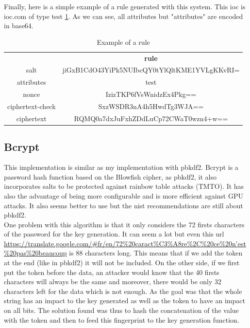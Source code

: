 \documentclass{eplmastersthesis}
\begin{document}
Finally, here is a simple example of a rule generated with this system. This \gls{ioc} is ioc.com of type test \ref{Example-rule-pbkdf2}. As we can see, all attributes but "attributes" are encoded in base64.
\begin{table}[]
\centering
\caption{Example of a rule}
\label{Example-rule-pbkdf2}
\begin{tabular}{cc}
{\textbf{}}  & {\textbf{rule}}                          \\
salt             & jiGxB1CdO43YiPk5NUIbcQY0tYlQltKME1YVLgKKvRI= \\
attributes       & test                                         \\
nonce            & IzizTKP6fVsWnidzEx4Pkg==                     \\
ciphertext-check & SxzWSDR3nA4h5HwdTg3WJA==                     \\
ciphertext       & RQMQ0a7dxJuFxhZDdLuCp72CWaT0wzn4+w==        
\end{tabular}
\end{table}

\subsection{Bcrypt}
\label{sec:BcryptExp}
This implementation is similar as my implementation with \gls{pbkdf2}. Bcrypt is a password hash function based on the Blowfish cipher, as \gls{pbkdf2}, it also incorporates salts to be protected against rainbow table attacks (TMTO).
It has also the advantage of being more configurable and is more efficient against GPU attacks. It also seems better to use but the \gls{nist} recommendations are still about \gls{pbkdf2}.\\

One problem with this algorithm is that it only considers the 72 firsts characters of the password for the key generation. It can seem a lot but even this \gls{url} \url{https://translate.google.com/#fr/en/72\%20caract\%C3\%A8re\%2C\%20ce\%20n'est\%20pas\%20beaucoup} is 88 characters long. This means that if we add the token at the end (like in \gls{pbkdf2}) it will not be included. On the other side, if we first put the token before the data, an attacker would know that the 40 firsts characters will always be the same and moreover, there would be only 32 characters left for the data which is not enough.
As the goal was that the whole string has an impact to the key generated as well as the token to have an impact on all bits. The solution found was thus  to hash the concatenation of the value with the token and then to feed this fingerprint to the key generation function.\\
\end{document}
